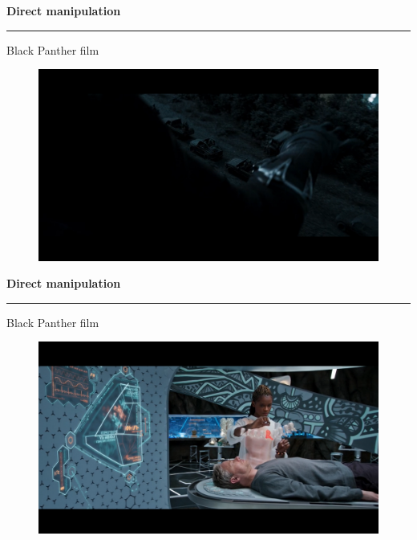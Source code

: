 \documentclass[pdf]{beamer}
\begin{document}
\begin{frame}
{\textbf{Direct manipulation}}{\textcolor{red}{\rule{12cm}{1.2pt}}}

Black Panther film

\vspace{-0.5cm}

\begin{figure}
\centering
\includegraphics[scale=0.27]{Black_Panther_DM_2.png}
\end{figure}
        
\end{frame}



\begin{frame}
{\textbf{Direct manipulation}}{\textcolor{red}{\rule{12cm}{1.2pt}}}

Black Panther film

\vspace{-0.5cm}

\begin{figure}
\centering
\includegraphics[scale=0.27]{Black_Panther_DM_3.png}
\end{figure}
        
\end{frame}
\end{document}
